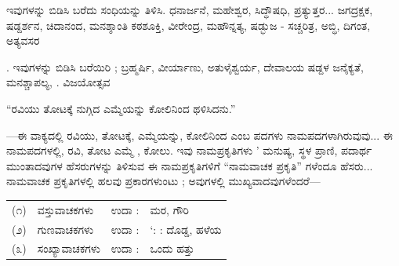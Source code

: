 \begin{kbvderiv}
\vspace{4pt plus 3pt minus 1pt}
\vspace{4pt plus 3pt minus 1pt}
\end{kbvderiv}

\vspace{2.5pt plus 3pt minus 0.5pt}\noindent\hspace*{1.2em}\hspace{0.55em}ಇವುಗಳನ್ನು ಬಿಡಿಸಿ ಬರೆದು ಸಂಧಿಯನ್ನು ತಿಳಿಸಿ. ಧನಾರ್ಜನೆ, ಮಹೇಶ್ವರ, ಸಿದ್ಧೌಷಧಿ, ಪ್ರತ್ಯುತ್ತರ... ಜಗದ್ರಕ್ಷಕ, ಷಡ್ದರ್ಶನ, ಚಿದಾನಂದ, ಮನಶ್ಶಾಂತಿ ಕಠಶೂಕ್ತಿ, ವೀರೇಂದ್ರ, ಮಹೌನ್ನತ್ಯ, ಷಡ್ಭುಜ - ಸಚ್ಚರಿತ್ರ, ಅಬ್ಧಿ, ದಿಗಂತ, ಅತ್ಯವಸರ\par

\vspace{2.5pt plus 3pt minus 0.5pt}\noindent\hspace*{1.2em}\hspace{0.55em}. ಇವುಗಳನ್ನು ಬಿಡಿಸಿ ಬರೆಯಿರಿ ; ಬ್ರಹ್ಮರ್ಷಿ, ವೀರ್ಯಾಣು, ಅತುಳೈಶ್ವರ್ಯ, ದೇವಾಲಯ ಷಡ್ದಳ ಜನೈಕ್ಯತೆ, ಮನಶ್ಚಾಪಲ್ಯ, . ವಿಜಯೋತ್ಸವ\par


\indent “ರವಿಯು ತೋಟಕ್ಕೆ ನುಗ್ಗಿದ ಎಮ್ಮೆಯನ್ನು ಕೋಲಿನಿಂದ ಥಳಿಸಿದನು.”\par

\indent —ಈ ವಾಕ್ಯದಲ್ಲಿ ರವಿಯು, ತೋಟಕ್ಕೆ, ಎಮ್ಮೆಯನ್ನು, ಕೋಲಿನಿಂದ ಎಂಬ ಪದಗಳು ನಾಮಪದಗಳಾಗಿರುವುವು... ಈ ನಾಮಪದಗಳಲ್ಲಿ, ರವಿ, ತೋಟ ಎಮ್ಮೆ , ಕೋಲು. ಇವು ನಾಮಪ್ರಕೃತಿಗಳು ' ಮನುಷ್ಯ, ಸ್ಥಳ ಪ್ರಾಣಿ, ಪದಾರ್ಥ ಮುಂತಾದವುಗಳ ಹೆಸರುಗಳನ್ನು ತಿಳಿಸುವ ಈ ನಾಮಪ್ರಕೃತಿಗಳಿಗೆ “ನಾಮವಾಚಕ ಪ್ರಕೃತಿ” ಗಳೆಂದೂ ಹೆಸರು... ನಾಮವಾಚಕ ಪ್ರಕೃತಿಗಳಲ್ಲಿ ಹಲವು ಪ್ರಕಾರಗಳುಂಟು ; ಅವುಗಳಲ್ಲಿ ಮುಖ್ಯವಾದವುಗಳೆಂದರೆ—\par

\vspace{4pt plus 3pt minus 1pt}
\begin{center}
{\renewcommand{\arraystretch}{1.22}\setlength{\tabcolsep}{5pt}
\begin{tabular}{r l c l}
(೧) & ವಸ್ತುವಾಚಕಗಳು & ಉದಾ : & ಮರ, ಗೌರಿ \\
(೨) & ಗುಣವಾಚಕಗಳು & ಉದಾ : & `: : ದೊಡ್ಡ, ಹಳೆಯ \\
(೩) & ಸಂಖ್ಯಾವಾಚಕಗಳು & ಉದಾ : & ಒಂದು ಹತ್ತು \\
\end{tabular}}
\end{center}
\vspace{4pt plus 3pt minus 1pt}

